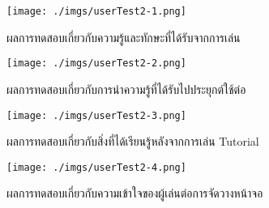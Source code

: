 \documentclass[12pt,oneside,openright,a4paper]{cpe-thai-project}
\begin{document}
  \begin{figure}[H]\centering
    \texttt{[image: ./imgs/userTest2-1.png]}
    \caption{ผลการทดสอบเกี่ยวกับความรู้และทักษะที่ได้รับจากการเล่น}\label{fig:userTest2-1}
  \end{figure}

  \begin{figure}[H]\centering
    \texttt{[image: ./imgs/userTest2-2.png]}
    \caption{ผลการทดสอบเกี่ยวกับการนำความรู้ที่ได้รับไปประยุกต์ใช้ต่อ}\label{fig:userTest2-2}
  \end{figure}

  \begin{figure}[H]\centering
    \texttt{[image: ./imgs/userTest2-3.png]}
    \caption{ผลการทดสอบเกี่ยวกับสิ่งที่ได้เรียนรู้หลังจากการเล่น Tutorial}\label{fig:userTest2-3}
  \end{figure}

  \begin{figure}[H]\centering
    \texttt{[image: ./imgs/userTest2-4.png]}
    \caption{ผลการทดสอบเกี่ยวกับความเข้าใจของผู้เล่นต่อการจัดวางหน้าจอ}\label{fig:userTest2-4}
  \end{figure}
\end{document}
